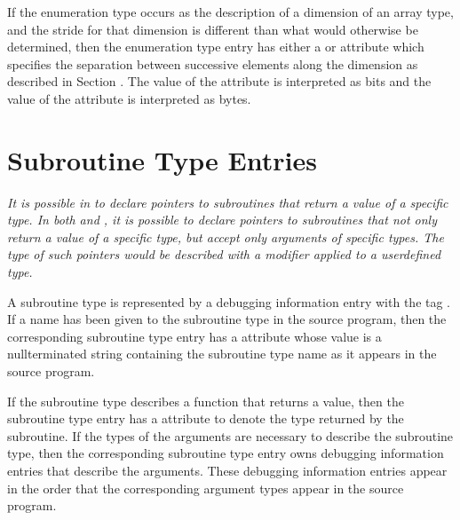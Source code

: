 If the enumeration type occurs as the description of a
dimension of an array type, and the stride for that dimension
\hypertarget{chap:DWATbytestrideenumerationstridedimensionofarraytype}{}
is different than what would otherwise be determined, then
\hypertarget{chap:DWATbitstrideenumerationstridedimensionofarraytype}{}
the enumeration type entry has either a 
\DWATbytestride{}
or \DWATbitstride{} attribute 
which specifies the separation
between successive elements along the dimension as described
in 
Section . 
The value of the 
\DWATbitstride{} attribute
is interpreted as bits and the value of 
the 
\DWATbytestride{}
attribute is interpreted as bytes.


\section{Subroutine Type Entries}
\label{chap:subroutinetypeentries}

\textit{It is possible in 
to declare pointers to subroutines
that return a value of a specific type. In both 
 and ,
it is possible to declare pointers to subroutines that not
only return a value of a specific type, but accept only
arguments of specific types. The type of such pointers would
be described with a  modifier applied to a
user\dash defined type.}

A subroutine type is represented by a debugging information
entry with the 
tag \DWTAGsubroutinetypeTARG. 
If a name has
been given to the subroutine type in the source program,
then the corresponding subroutine type entry has 
a \DWATname{} attribute 
whose value is a null\dash terminated string containing
the subroutine type name as it appears in the source program.

If the subroutine type describes a function that returns
a value, then the subroutine type entry has 
a \DWATtype{}
attribute to denote the type returned by the subroutine. If
the types of the arguments are necessary to describe the
subroutine type, then the corresponding subroutine type
entry owns debugging information entries that describe the
arguments. These debugging information entries appear in the
order that the corresponding argument types appear in the
source program.

